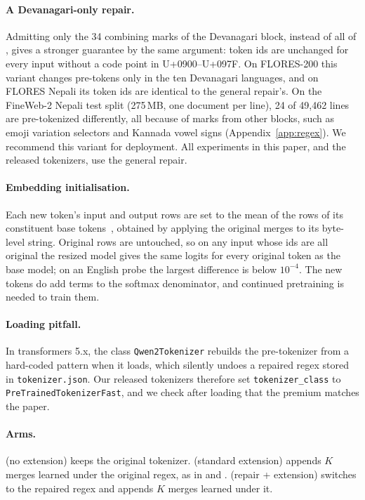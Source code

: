 \paragraph{A Devanagari-only repair.} Admitting only the 34 combining marks of the Devanagari block, instead of all of \pM{}, gives a stronger guarantee by the same argument: token ids are unchanged for every input without a code point in U+0900--U+097F. On FLORES-200 this variant changes pre-tokens only in the ten Devanagari languages, and on FLORES Nepali its \RII{} token ids are identical to the general repair's. On the FineWeb-2 Nepali test split (275\,MB, one document per line), 24 of 49{,}462 lines are pre-tokenized differently, all because of marks from other blocks, such as emoji variation selectors and Kannada vowel signs (Appendix~\ref{app:regex}). We recommend this variant for deployment. All experiments in this paper, and the released tokenizers, use the general repair.

\paragraph{Embedding initialisation.} Each new token's input and output rows are set to the mean of the rows of its constituent base tokens~\citep{gee-etal-2022-fast}, obtained by applying the original merges to its byte-level string. Original rows are untouched, so on any input whose ids are all original the resized model gives the same logits for every original token as the base model; on an English probe the largest difference is below $10^{-4}$. The new tokens do add terms to the softmax denominator, and continued pretraining is needed to train them.

\paragraph{Loading pitfall.} In transformers 5.x, the class \texttt{Qwen2Tokenizer} rebuilds the pre-tokenizer from a hard-coded pattern when it loads, which silently undoes a repaired regex stored in \texttt{tokenizer.json}. Our released tokenizers therefore set \texttt{tokenizer\_class} to \texttt{PreTrainedTokenizerFast}, and we check after loading that the premium matches the paper.

\paragraph{Arms.} \RO{} (no extension) keeps the original tokenizer. \RI{} (standard extension) appends $K$ merges learned under the original regex, as in \citet{purason-etal-2026-teaching} and \citet{yamaguchi2026lowres}. \RII{} (repair + extension) switches to the repaired regex and appends $K$ merges learned under it.
